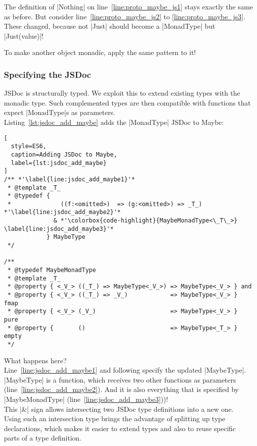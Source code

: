 The definition of |Nothing| on line~\ref{line:proto_maybe_js1} stays exactly
the same as before. But consider line~\ref{line:proto_maybe_js2} to
\ref{line:proto_maybe_js3}. These changed, because not |Just| should become a
|MonadType| but |Just(value)|!

To make another object monadic, apply the same pattern to it!



\subsubsection{Specifying the JSDoc} %
\label{sec:Specify the JSDoc}
JSDoc is structurally typed. We exploit this to extend existing types with
the monadic type. Such complemented types are then compatible with functions
that expect |MonadType|s as parameters. \\ 
Listing~\ref{lst:jsdoc_add_maybe} adds the |MonadType| JSDoc to Maybe:

\begin{lstlisting}[
  style=ES6,
  caption=Adding JSDoc to Maybe,
  label={lst:jsdoc_add_maybe}
]
/** *'\label{line:jsdoc_add_maybe1}'*
 * @template _T_
 * @typedef { 
 *              ((f:<omitted>)  => (g:<omitted>) => _T_) *'\label{line:jsdoc_add_maybe2}'*
              & *'\colorbox{code-highlight}{MaybeMonadType<\_T\_>} \label{line:jsdoc_add_maybe3}'*
            } MaybeType
 */

/** 
 * @typedef MaybeMonadType
 * @template _T_
 * @property { <_V_> ((_T_) => MaybeType<_V_>) => MaybeType<_V_> } and
 * @property { <_V_> ((_T_) => _V_)            => MaybeType<_V_> } fmap
 * @property { <_V_> (_V_)                     => MaybeType<_V_> } pure
 * @property {       ()                        => MaybeType<_T_> } empty
 */
\end{lstlisting}

What happens here? \\ 
Line~\ref{line:jsdoc_add_maybe1} and following specify the updated |MaybeType|.
|MaybeType| is a function, which receives two other functions as parameters
(line~\ref{line:jsdoc_add_maybe2}). And it is also everything that is specified by
|MaybeMonadType| (line~\ref{line:jsdoc_add_maybe3}))! \\
This |&| sign allows intersecting two JSDoc type definitions into a new one.\\

Using such an intersection type brings the advantage of splitting up type
declarations, which makes it easier to extend types and also to reuse specific
parts of a type definition.

